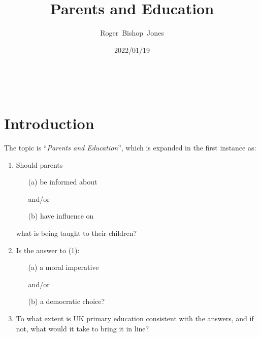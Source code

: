\documentclass[10pt,titlepage]{article}
\title{\LARGE\bf Parents and Education}
\author{Roger~Bishop~Jones}
\date{\small 2022/01/19}
\newcommand{\ignore}[1]{}
\begin{document}
                               
\begin{titlepage}
\maketitle





\end{titlepage}

\ \

\ignore{
\begin{centering}
{}
\end{centering}
}%

\setcounter{tocdepth}{2}
{\parskip-0pt\tableofcontents}


\pagebreak


\section{Introduction}

The topic is ``\emph{Parents and Education}'', which is expanded in the first instance as:

\begin{enumerate}
\item Should parents
  \begin{itemize}
  \item[(a)] be informed about

    and/or
  \item[(b)] have influence on
    \end{itemize}
what is being taught to their children?

\item Is the answer to (1):
  \begin{itemize}
  \item[(a)] a moral imperative

    and/or
    \item[(b)] a democratic choice?
  \end{itemize}
\item To what extent is UK primary education consistent with the answers,
and if not, what would it take to bring it in line?
\end{enumerate}
\end{document}
